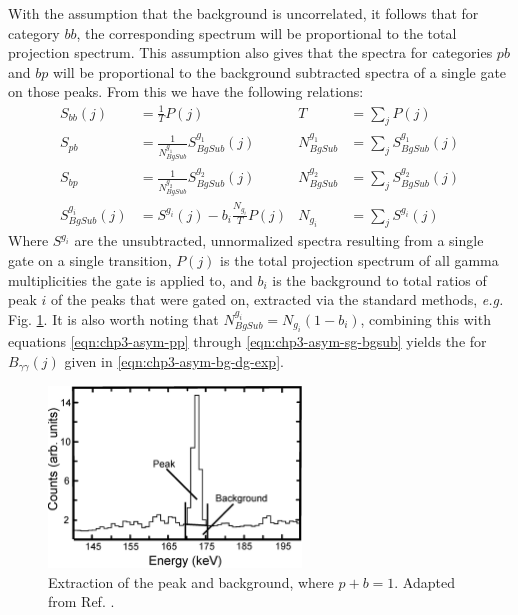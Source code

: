 With the assumption that the background is uncorrelated, it follows that for category $bb$, the corresponding spectrum will be proportional to the total projection spectrum. This assumption also gives that the spectra for categories $pb$ and $bp$ will be proportional to the background subtracted spectra of a single gate on those peaks. From this we have the following relations:
\begin{align}
S_{bb}(j) &=\frac{1}{T}P(j) & T &= \sum\limits_{j}^{}P(j) \label{eqn:chp3-asym-bb}\\
S_{pb} &= \frac{1}{N^{g_1}_{BgSub}}S^{g_1}_{BgSub}(j)  & N^{g_1}_{BgSub} &= \sum\limits_{j}^{}S^{g_1}_{BgSub}(j) \label{eqn:chp3-asym-bp}\\
S_{bp} &= \frac{1}{N^{g_2}_{BgSub}}S^{g_2}_{BgSub}(j)  & N^{g_2}_{BgSub} &= \sum\limits_{j}^{}S^{g_2}_{BgSub}(j) \label{eqn:chp3-asym-pb}\\
S^{g_i}_{BgSub}(j) &= S^{g_i}(j) - b_i \frac{N_{g_i}}{T}P(j) & N_{g_i} &=  \sum\limits_{j}^{}S^{g_i}(j)  \label{eqn:chp3-asym-sg-bgsub}
\end{align}
Where $S^{g_i}$ are the unsubtracted, unnormalized spectra resulting from a single gate on a single transition, $P(j)$ is the total projection spectrum of all gamma multiplicities the gate is applied to, and $b_i$ is the background to total ratios of peak $i$ of the peaks that were gated on, extracted via the standard methods, \emph{e.g.} Fig. \ref{fig:chp3-asym-bg-ratio}. It is also worth noting that $N^{g_i}_{BgSub} = N_{g_i}(1 - b_i)$, combining this with equations \ref{eqn:chp3-asym-pp} through \ref{eqn:chp3-asym-sg-bgsub} yields the for $B_{\gamma{}\gamma{}}(j)$ given in \ref{eqn:chp3-asym-bg-dg-exp}.

\begin{figure}[h!]
	\centerline{\includegraphics[width=0.6\textwidth]{./img/c3/peak_to_bg_asym_bg.eps}}
	\caption{Extraction of the peak and background, where $p + b = 1$. Adapted from Ref. \cite{asymBGSub}.\label{fig:chp3-asym-bg-ratio}}
\end{figure}

